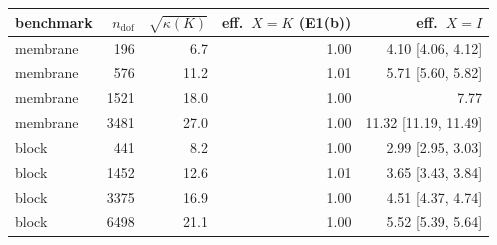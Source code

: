 \begin{tabular}{lrrrr}
\hline
benchmark & $n_{\mathrm{dof}}$ & $\sqrt{\kappa(K)}$ & eff.\ $X=K$ (E1(b)) & eff.\ $X=I$ \\
\hline
membrane & 196 & 6.7 & 1.00 & 4.10 [4.06, 4.12] \\
membrane & 576 & 11.2 & 1.01 & 5.71 [5.60, 5.82] \\
membrane & 1521 & 18.0 & 1.00 & 7.77 \\
membrane & 3481 & 27.0 & 1.00 & 11.32 [11.19, 11.49] \\
block & 441 & 8.2 & 1.00 & 2.99 [2.95, 3.03] \\
block & 1452 & 12.6 & 1.01 & 3.65 [3.43, 3.84] \\
block & 3375 & 16.9 & 1.00 & 4.51 [4.37, 4.74] \\
block & 6498 & 21.1 & 1.00 & 5.52 [5.39, 5.64] \\
\hline
\end{tabular}
